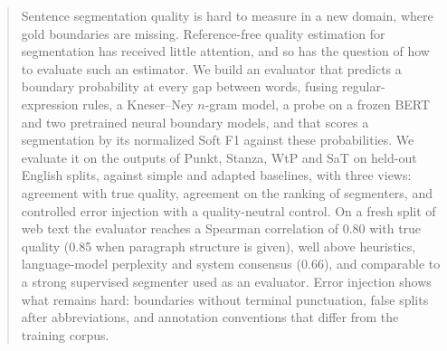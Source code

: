
\begin{abstract}
Sentence segmentation quality is hard to measure in a new domain, where gold boundaries are missing.
Reference-free quality estimation for segmentation has received little attention, and so has the question of how to
evaluate such an estimator. We build an evaluator that predicts a boundary probability at every gap between words,
fusing regular-expression rules, a Kneser--Ney $n$-gram model, a probe on a frozen BERT and two pretrained neural
boundary models, and that scores a segmentation by its normalized Soft F1 against these probabilities. We evaluate it on
the outputs of Punkt, Stanza, WtP and SaT on held-out English splits, against simple and adapted baselines, with three
views: agreement with true quality, agreement on the ranking of segmenters, and controlled error injection with a
quality-neutral control. On a fresh split of web text the evaluator reaches a Spearman correlation of 0.80 with true
quality (0.85 when paragraph structure is given), well above heuristics, language-model perplexity and system consensus
(0.66), and comparable to a strong supervised segmenter used as an evaluator. Error injection shows what remains hard:
boundaries without terminal punctuation, false splits after abbreviations, and annotation conventions that differ from
the training corpus.
\end{abstract}
